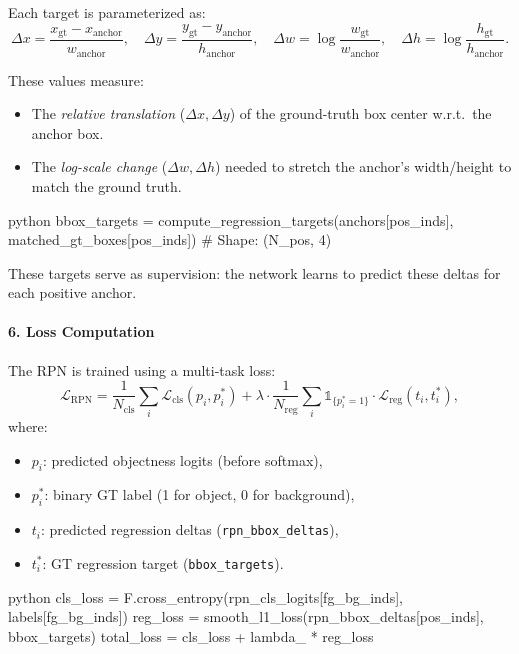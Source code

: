 \begin{enrichment}
    Each target is parameterized as:
    \[
    \Delta x = \frac{x_{\text{gt}} - x_{\text{anchor}}}{w_{\text{anchor}}}, \quad
    \Delta y = \frac{y_{\text{gt}} - y_{\text{anchor}}}{h_{\text{anchor}}}, \quad
    \Delta w = \log \frac{w_{\text{gt}}}{w_{\text{anchor}}}, \quad
    \Delta h = \log \frac{h_{\text{gt}}}{h_{\text{anchor}}}.
    \]
    
    These values measure:
    \begin{itemize}
        \item The \emph{relative translation} (\(\Delta x, \Delta y\)) of the ground-truth box center w.r.t.\ the anchor box.
        \item The \emph{log-scale change} (\(\Delta w, \Delta h\)) needed to stretch the anchor's width/height to match the ground truth.
    \end{itemize}
    
    \begin{mintedbox}{python}
        bbox_targets = compute_regression_targets(anchors[pos_inds], matched_gt_boxes[pos_inds])
        # Shape: (N_pos, 4)
    \end{mintedbox}
    
    These targets serve as supervision: the network learns to predict these deltas for each positive anchor.
    
    \paragraph{6. Loss Computation}
    The RPN is trained using a multi-task loss:
    \[
    \mathcal{L}_{\text{RPN}} = 
    \frac{1}{N_{\text{cls}}} \sum_i \mathcal{L}_{\text{cls}}(p_i, p_i^*) 
    + \lambda \cdot 
    \frac{1}{N_{\text{reg}}} \sum_i \mathbb{1}_{\{p_i^* = 1\}} 
    \cdot \mathcal{L}_{\text{reg}}(t_i, t_i^*),
    \]
    where:
    \begin{itemize}
        \item \(p_i\): predicted objectness logits (before softmax),
        \item \(p_i^*\): binary GT label (1 for object, 0 for background),
        \item \(t_i\): predicted regression deltas (\texttt{rpn\_bbox\_deltas}),
        \item \(t_i^*\): GT regression target (\texttt{bbox\_targets}).
    \end{itemize}
    
    \begin{mintedbox}{python}
        cls_loss = F.cross_entropy(rpn_cls_logits[fg_bg_inds], labels[fg_bg_inds])
        reg_loss = smooth_l1_loss(rpn_bbox_deltas[pos_inds], bbox_targets)
        total_loss = cls_loss + lambda_ * reg_loss
    \end{mintedbox}
    

\end{enrichment}
